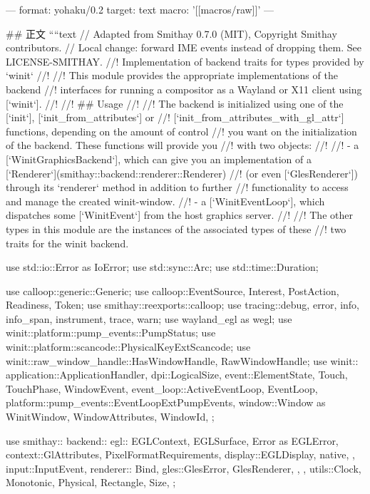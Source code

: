 ---
format: yohaku/0.2
target: text
macro: '[[macros/raw]]'
---

## 正文
````text
// Adapted from Smithay 0.7.0 (MIT), Copyright Smithay contributors.
// Local change: forward IME events instead of dropping them. See LICENSE-SMITHAY.
//! Implementation of backend traits for types provided by `winit`
//!
//! This module provides the appropriate implementations of the backend
//! interfaces for running a compositor as a Wayland or X11 client using [`winit`].
//!
//! ## Usage
//!
//! The backend is initialized using one of the [`init`], [`init_from_attributes`] or
//! [`init_from_attributes_with_gl_attr`] functions, depending on the amount of control
//! you want on the initialization of the backend. These functions will provide you
//! with two objects:
//!
//! - a [`WinitGraphicsBackend`], which can give you an implementation of a [`Renderer`](smithay::backend::renderer::Renderer)
//!   (or even [`GlesRenderer`]) through its `renderer` method in addition to further
//!   functionality to access and manage the created winit-window.
//! - a [`WinitEventLoop`], which dispatches some [`WinitEvent`] from the host graphics server.
//!
//! The other types in this module are the instances of the associated types of these
//! two traits for the winit backend.

use std::io::Error as IoError;
use std::sync::Arc;
use std::time::Duration;

use calloop::generic::Generic;
use calloop::{EventSource, Interest, PostAction, Readiness, Token};
use smithay::reexports::calloop;
use tracing::{debug, error, info, info_span, instrument, trace, warn};
use wayland_egl as wegl;
use winit::platform::pump_events::PumpStatus;
use winit::platform::scancode::PhysicalKeyExtScancode;
use winit::raw_window_handle::{HasWindowHandle, RawWindowHandle};
use winit::{
    application::ApplicationHandler,
    dpi::LogicalSize,
    event::{ElementState, Touch, TouchPhase, WindowEvent},
    event_loop::{ActiveEventLoop, EventLoop},
    platform::pump_events::EventLoopExtPumpEvents,
    window::{Window as WinitWindow, WindowAttributes, WindowId},
};

use smithay::{
    backend::{
        egl::{
            EGLContext, EGLSurface, Error as EGLError,
            context::{GlAttributes, PixelFormatRequirements},
            display::EGLDisplay,
            native,
        },
        input::InputEvent,
        renderer::{
            Bind,
            gles::{GlesError, GlesRenderer},
        },
    },
    utils::{Clock, Monotonic, Physical, Rectangle, Size},
};

